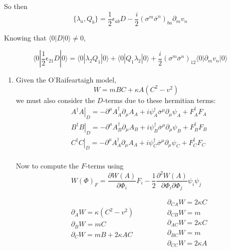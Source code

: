 \documentclass[twoside]{amsart}
\newcommand{\problemhead}[1]
  {\smallskip
   \noindent{\large\bf Problem #1.}
   }
\begin{document}
\begin{enumerate}
So then 
\[
\lbrace \lambda_a, Q_b \rbrace = \frac{1}{2} \epsilon_{ab} D - \frac{i}{2} (\sigma^m \overline{\sigma}^n)_{ba} \partial_m v_n
\]

Knowing that $\langle 0 | D| 0 \rangle \neq 0$, 

\[
\langle 0 | \frac{1}{2} \epsilon_{21} D | 0 \rangle = \langle 0 | \lambda_2 Q_1 | 0 \rangle + \langle 0 | Q_1 \lambda_2 | 0 \rangle + \frac{i}{2} (\sigma^m \overline{\sigma}^n)_{12} \langle 0 | \partial_m v_n | 0 \rangle
\]

\end{enumerate}

\problemhead{95.3}
\begin{enumerate}
\item[(a)] Given the O'Raifeartaigh model, 
\[
W = mBC + \kappa A (C^2-v^2)
\]
we must also consider the $D$-terms due to these hermitian terms:
\[
\begin{aligned}
  & \left. A^{\dag} A \right|_D = - \partial^{\mu} A_A^{\dag} \partial_{\mu} A_A + i \psi_A^{\dag} \overline{\sigma}^{\mu} \partial_{\mu} \psi_A + F_A^{\dag} F_A \\ 
  & \left. B^{\dag} B \right|_D = - \partial^{\mu} A_B^{\dag} \partial_{\mu} A_B + i \psi_B^{\dag} \overline{\sigma}^{\mu} \partial_{\mu} \psi_B + F_B^{\dag} F_B \\
  & \left. C^{\dag} C \right|_D = - \partial^{\mu} A_A^{\dag} \partial_{\mu} A_A + i \psi_C^{\dag} \overline{\sigma}^{\mu} \partial_{\mu} \psi_C + F_C^{\dag} F_C \\
\end{aligned}
\]

Now to compute the $F$-terms using
\[
W(\Phi)_F = \frac{ \partial W(A) }{ \partial \Phi_i } F_i - \frac{1}{2} \frac{ \partial^2 W(A)}{ \partial \Phi_i \partial\Phi_j } \psi_i \psi_j 
\]

\[
\begin{aligned}
& \partial_A W = \kappa (C^2-  v^2) \\ 
& \partial_B W = m C \\ 
&  \partial_C W = mB + 2 \kappa AC
\end{aligned} \quad \quad \quad \, 
\begin{aligned}
  & \partial_{CA} W  = 2 \kappa C \\ 
 &  \partial_{CB} W = m \\ 
  & \partial_{AC} W = 2 \kappa C \\ 
  & \partial_{BC} W = m \\
  & \partial_{CC} W = 2 \kappa A
\end{aligned}
\]


\end{enumerate}
\end{document}
